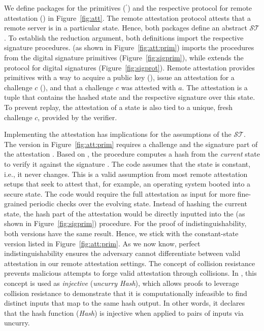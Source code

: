 %
We define packages for the primitives (\pattprot$^\prime$) and 
the respective protocol for remote attestation (\pattprot) 
in Figure~\ref{fig:att}.
%
The remote attestation protocol attests that a remote
server is in a particular state.
%
Hence, both packages define an abstract \ststate $\mathcal{ST}$.
%
To establish the reduction argument, both definitions
import the respective signature procedures.
%
\pattprim (as shown in Figure~\ref{fig:att:prim}) imports the procedures from the digital signature
primitives (Figure~\ref{fig:sigprim}), while \pattprot extends 
the protocol for digital signatures (Figure~\ref{fig:sigprot}).
%
Remote attestation provides primitives with a way to 
acquire a public key (\egetpka), 
issue an attestation for a challenge $c$ (\eattest), and
\everifya that a challenge $c$ was attested with $a$.
%
The attestation is a tuple that contains the hashed state
and the respective signature over this state.
%
To prevent replay, the attestation of a state is also tied to a unique, 
fresh challenge \(c\), provided by the verifier.
%

%
Implementing the attestation has implications for the assumptions of the \ststate $\mathcal{ST}$.
%
The \everifya version in Figure~\ref{fig:att:prim} requires 
a challenge  and
the signature part of the attestation .
%
Based on , the procedure computes a 
hash  from the \emph{current} state to verify it 
against the signature .
%
The code assumes that the state is constant, i.e.,
it never changes.
%
This is a valid assumption from most remote attestation setups
that seek to attest that, for example, an operating system booted 
into a secure state.
%
The code would require the full attestation as input 
for more fine-grained periodic checks over the evolving state.
%
Instead of hashing the current state, the hash part of the
attestation would be directly inputted into the \eversig (as shown in Figure~\ref{fig:sigprim}) procedure.
%
For the proof of indistinguishability, both versions have the same result.
%
Hence, we stick with the constant-state version listed in
Figure~\ref{fig:att:prim}.
%
As we now know, perfect indistinguishability ensures the adversary 
cannot differentiate between valid attestation in our remote attestation settings.
%
The concept of collision resistance prevents malicious 
attempts to forge valid attestation through collisions.
%
In \ssprove, this concept is used as \emph{injective} (\emph{uncurry Hash}), which allows proofs to 
leverage collision resistance to demonstrate that it is computationally infeasible 
to find distinct inputs that map to the same hash output. 
%
In other words, it declares that the hash function (\emph{Hash}) is 
injective when applied to pairs of inputs via uncurry. 
%

